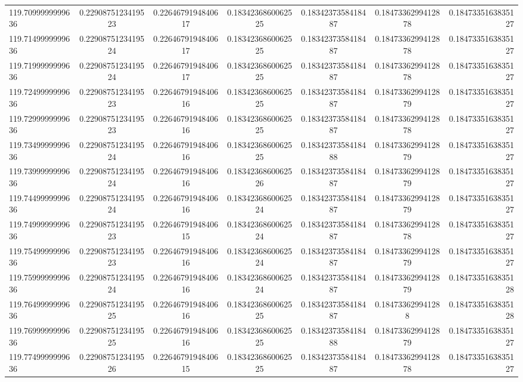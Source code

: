 \begin{tabular}{ l | c | c | c | c | c | r }
119.7099999999636  & 0.2290875123419523  & 0.2264679194840617  & 0.1834236860062525  & 0.1834237358418487  & 0.1847336299412878  & 0.1847335163835127 \\
119.7149999999636  & 0.2290875123419524  & 0.2264679194840617  & 0.1834236860062525  & 0.1834237358418487  & 0.1847336299412878  & 0.1847335163835127 \\
119.7199999999636  & 0.2290875123419524  & 0.2264679194840617  & 0.1834236860062525  & 0.1834237358418487  & 0.1847336299412878  & 0.1847335163835127 \\
119.7249999999636  & 0.2290875123419523  & 0.2264679194840616  & 0.1834236860062525  & 0.1834237358418487  & 0.1847336299412879  & 0.1847335163835127 \\
119.7299999999636  & 0.2290875123419523  & 0.2264679194840616  & 0.1834236860062525  & 0.1834237358418487  & 0.1847336299412878  & 0.1847335163835127 \\
119.7349999999636  & 0.2290875123419524  & 0.2264679194840616  & 0.1834236860062525  & 0.1834237358418488  & 0.1847336299412879  & 0.1847335163835127 \\
119.7399999999636  & 0.2290875123419524  & 0.2264679194840616  & 0.1834236860062526  & 0.1834237358418487  & 0.1847336299412879  & 0.1847335163835127 \\
119.7449999999636  & 0.2290875123419524  & 0.2264679194840616  & 0.1834236860062524  & 0.1834237358418487  & 0.1847336299412879  & 0.1847335163835127 \\
119.7499999999636  & 0.2290875123419523  & 0.2264679194840615  & 0.1834236860062524  & 0.1834237358418487  & 0.1847336299412878  & 0.1847335163835127 \\
119.7549999999636  & 0.2290875123419523  & 0.2264679194840616  & 0.1834236860062524  & 0.1834237358418487  & 0.1847336299412879  & 0.1847335163835127 \\
119.7599999999636  & 0.2290875123419524  & 0.2264679194840616  & 0.1834236860062524  & 0.1834237358418487  & 0.1847336299412879  & 0.1847335163835128 \\
119.7649999999636  & 0.2290875123419525  & 0.2264679194840616  & 0.1834236860062525  & 0.1834237358418487  & 0.184733629941288  & 0.1847335163835128 \\
119.7699999999636  & 0.2290875123419525  & 0.2264679194840616  & 0.1834236860062525  & 0.1834237358418488  & 0.1847336299412879  & 0.1847335163835127 \\
119.7749999999636  & 0.2290875123419526  & 0.2264679194840615  & 0.1834236860062525  & 0.1834237358418487  & 0.1847336299412878  & 0.1847335163835127 \\

\end{tabular}
